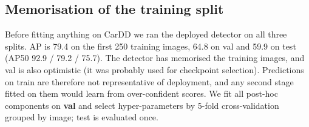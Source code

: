 \documentclass[10pt,twocolumn]{article}
\begin{document}
\begin{table}[t]\centering\small\caption{Per-class box AP / AP50 on CarDD test. The CarDD-paper column is \emph{mask} AP (Table II of ~\cite{cardd}) and is shown for orientation only.}\end{table}
\subsection{Memorisation of the training split}
Before fitting anything on CarDD we ran the deployed detector on all three splits. AP is 79.4 on the first 250 training images, 64.8 on val and 59.9 on test (AP50 92.9 / 79.2 / 75.7). The detector has memorised the training images, and val is also optimistic (it was probably used for checkpoint selection). Predictions on train are therefore not representative of deployment, and any second stage fitted on them would learn from over-confident scores. We fit all post-hoc components on \textbf{val} and select hyper-parameters by 5-fold cross-validation grouped by image; test is evaluated once.
\end{document}
